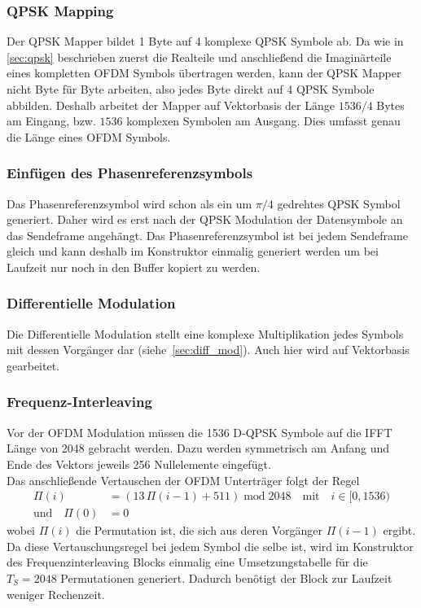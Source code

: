 \subsubsection{QPSK Mapping}
Der QPSK Mapper bildet 1 Byte auf 4 komplexe QPSK Symbole ab. Da wie in \ref{sec:qpsk} beschrieben zuerst die Realteile und anschließend die Imaginärteile eines kompletten OFDM Symbols übertragen werden, kann der QPSK Mapper nicht Byte für Byte arbeiten, also jedes Byte direkt auf 4 QPSK Symbole abbilden. Deshalb arbeitet der Mapper auf Vektorbasis der Länge $1536/4$ Bytes am Eingang, bzw. $1536$ komplexen Symbolen am Ausgang. Dies umfasst genau die Länge eines OFDM Symbols.

\subsubsection{Einfügen des Phasenreferenzsymbols}
Das Phasenreferenzsymbol wird schon als ein um $\pi/4$ gedrehtes QPSK Symbol generiert. Daher wird es erst nach der QPSK Modulation der Datensymbole an das Sendeframe angehängt. Das Phasenreferenzsymbol ist bei jedem Sendeframe gleich und kann deshalb im Konstruktor einmalig generiert werden um bei Laufzeit nur noch in den Buffer kopiert zu werden.

\subsubsection{Differentielle Modulation}
Die Differentielle Modulation stellt eine komplexe Multiplikation jedes Symbols mit dessen Vorgänger dar (siehe~\ref{sec:diff_mod}). Auch hier wird auf Vektorbasis gearbeitet.

\subsubsection{Frequenz-Interleaving}
Vor der OFDM Modulation müssen die 1536 D-QPSK Symbole auf die IFFT Länge von 2048 gebracht werden. Dazu werden symmetrisch am Anfang und Ende des Vektors jeweils 256 Nullelemente eingefügt.\\
Das anschließende Vertauschen der OFDM Unterträger folgt der Regel
\begin{equation}
\begin{aligned}
\Pi(i) &= (13\, \Pi(i-1) + 511)\; \text{mod}\; 2048 \quad \text{mit} \quad i \in [0,1536)\\
\text{und} \quad \Pi (0) &= 0
\end{aligned}
\end{equation}
wobei $\Pi(i)$ die Permutation ist, die sich aus deren Vorgänger $\Pi(i-1)$ ergibt. Da diese Vertauschungsregel bei jedem Symbol die selbe ist, wird im Konstruktor des Frequenzinterleaving Blocks einmalig eine Umsetzungstabelle für die $T_S=2048$ Permutationen generiert. Dadurch benötigt der Block zur Laufzeit weniger Rechenzeit.

